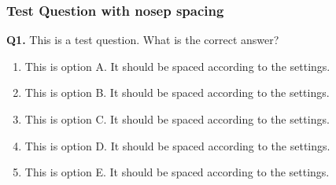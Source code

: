 \documentclass[
  letterpaper,
  DIV=11,
  numbers=noendperiod]{scrartcl}
\author{}
\date{}
\providecommand{\tightlist}{%
  \setlength{\itemsep}{0pt}\setlength{\parskip}{0pt}}
\def\tightlist{}
\begin{document}
\subsubsection{Test Question with nosep
spacing}\label{test-question-with-nosep-spacing}

\textbf{Q1.} This is a test question. What is the correct answer?

\begin{enumerate}
\def\labelenumi{\alph{enumi}.}
\tightlist
\item
  This is option A. It should be spaced according to the settings.
\item
  This is option B. It should be spaced according to the settings.
\item
  This is option C. It should be spaced according to the settings.
\item
  This is option D. It should be spaced according to the settings.
\item
  This is option E. It should be spaced according to the settings.
\end{enumerate}
\end{document}
